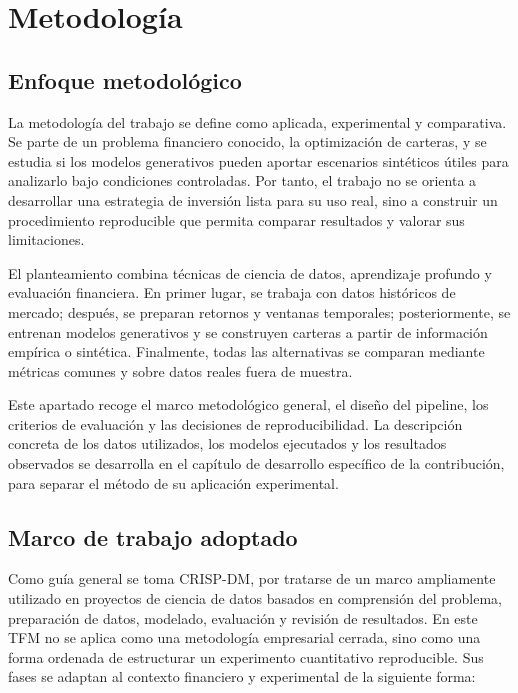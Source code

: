 \documentclass[11pt,a4paper,spanish,oneside]{book}
\numberwithin{equation}{chapter}
\numberwithin{figure}{chapter}
\begin{document}
\section{Metodología}

\subsection{Enfoque metodológico}

La metodología del trabajo se define como aplicada, experimental y comparativa. Se parte de un problema financiero conocido, la optimización de carteras, y se estudia si los modelos generativos pueden aportar escenarios sintéticos útiles para analizarlo bajo condiciones controladas. Por tanto, el trabajo no se orienta a desarrollar una estrategia de inversión lista para su uso real, sino a construir un procedimiento reproducible que permita comparar resultados y valorar sus limitaciones.

El planteamiento combina técnicas de ciencia de datos, aprendizaje profundo y evaluación financiera. En primer lugar, se trabaja con datos históricos de mercado; después, se preparan retornos y ventanas temporales; posteriormente, se entrenan modelos generativos y se construyen carteras a partir de información empírica o sintética. Finalmente, todas las alternativas se comparan mediante métricas comunes y sobre datos reales fuera de muestra.

Este apartado recoge el marco metodológico general, el diseño del pipeline, los criterios de evaluación y las decisiones de reproducibilidad. La descripción concreta de los datos utilizados, los modelos ejecutados y los resultados observados se desarrolla en el capítulo de desarrollo específico de la contribución, para separar el método de su aplicación experimental.

\subsection{Marco de trabajo adoptado}

Como guía general se toma CRISP-DM, por tratarse de un marco ampliamente utilizado en proyectos de ciencia de datos basados en comprensión del problema, preparación de datos, modelado, evaluación y revisión de resultados. En este TFM no se aplica como una metodología empresarial cerrada, sino como una forma ordenada de estructurar un experimento cuantitativo reproducible. Sus fases se adaptan al contexto financiero y experimental de la siguiente forma:
\end{document}
